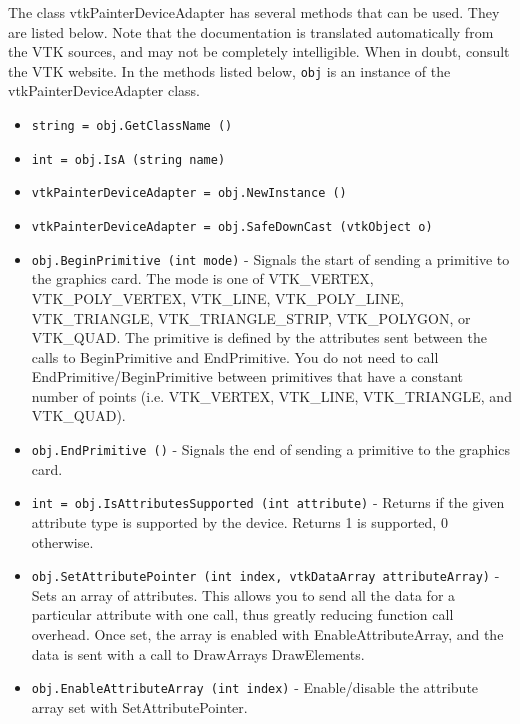 The class vtkPainterDeviceAdapter has several methods that can be used.
  They are listed below.
Note that the documentation is translated automatically from the VTK sources,
and may not be completely intelligible.  When in doubt, consult the VTK website.
In the methods listed below, \verb|obj| is an instance of the vtkPainterDeviceAdapter class.
\begin{itemize}
\item  \verb|string = obj.GetClassName ()|

\item  \verb|int = obj.IsA (string name)|

\item  \verb|vtkPainterDeviceAdapter = obj.NewInstance ()|

\item  \verb|vtkPainterDeviceAdapter = obj.SafeDownCast (vtkObject o)|

\item  \verb|obj.BeginPrimitive (int mode)| -  Signals the start of sending a primitive to the graphics card.  The
 mode is one of VTK\_VERTEX, VTK\_POLY\_VERTEX, VTK\_LINE, VTK\_POLY\_LINE,
 VTK\_TRIANGLE, VTK\_TRIANGLE\_STRIP, VTK\_POLYGON, or VTK\_QUAD.  The
 primitive is defined by the attributes sent between the calls to
 BeginPrimitive and EndPrimitive.  You do not need to call
 EndPrimitive/BeginPrimitive between primitives that have a constant
 number of points (i.e. VTK\_VERTEX, VTK\_LINE, VTK\_TRIANGLE, and
 VTK\_QUAD).

\item  \verb|obj.EndPrimitive ()| -  Signals the end of sending a primitive to the graphics card.

\item  \verb|int = obj.IsAttributesSupported (int attribute)| -  Returns if the given attribute type is supported by the device.
 Returns 1 is supported, 0 otherwise.

\item  \verb|obj.SetAttributePointer (int index, vtkDataArray attributeArray)| -  Sets an array of attributes.  This allows you to send all the data for
 a particular attribute with one call, thus greatly reducing function
 call overhead.  Once set, the array is enabled with
 EnableAttributeArray, and the data is sent with a call to DrawArrays
 DrawElements.

\item  \verb|obj.EnableAttributeArray (int index)| -  Enable/disable the attribute array set with SetAttributePointer.


\end{itemize}
